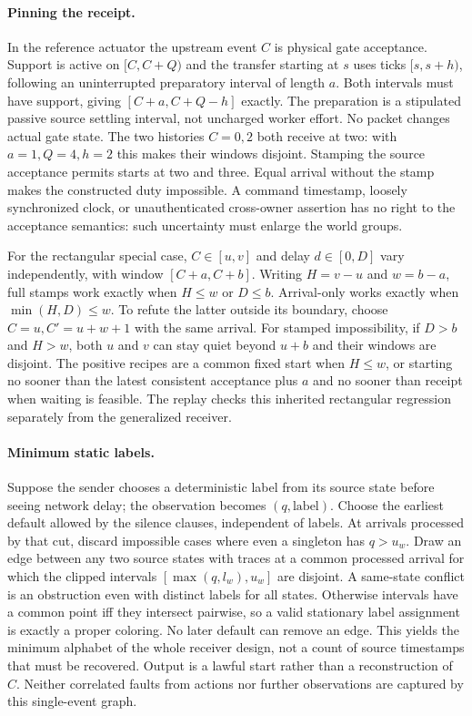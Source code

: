 \documentclass[11pt]{article}
\begin{document}
\paragraph{Pinning the receipt.}
In the reference actuator the upstream event $C$ is physical gate
acceptance. Support is active on $[C,C+Q)$ and the transfer starting at
$s$ uses ticks $[s,s+h)$, following an uninterrupted preparatory
interval of length $a$. Both intervals must have support, giving
$[C+a,C+Q-h]$ exactly. The preparation is a stipulated passive source
settling interval, not uncharged worker effort. No packet changes actual
gate state. The two histories $C=0,2$ both receive at two: with $a=1,Q=4,
h=2$ this makes their windows disjoint. Stamping the source acceptance
permits starts at two and three. Equal arrival without the stamp makes
the constructed duty impossible. A command timestamp, loosely
synchronized clock, or unauthenticated cross-owner assertion has no right
to the acceptance semantics: such uncertainty must enlarge the world
groups.

For the rectangular special case, $C\in[u,v]$ and delay $d\in[0,D]$
vary independently, with window $[C+a,C+b]$. Writing $H=v-u$ and
$w=b-a$, full stamps work exactly when $H\le w$ or $D\le b$.
Arrival-only works exactly when $\min(H,D)\le w$. To refute the latter
outside its boundary, choose $C=u,C'=u+w+1$ with the same arrival.
For stamped impossibility, if $D>b$ and $H>w$, both $u$ and $v$ can
stay quiet beyond $u+b$ and their windows are disjoint. The positive
recipes are a common fixed start when $H\le w$, or starting no sooner
than the latest consistent acceptance plus $a$ and no sooner than
receipt when waiting is feasible. The replay checks this inherited
rectangular regression separately from the generalized receiver.

\paragraph{Minimum static labels.}
Suppose the sender chooses a deterministic label from its source state
before seeing network delay; the observation becomes $(q,\mathrm{label})$.
Choose the earliest default allowed by the silence clauses, independent of
labels. At arrivals processed by that cut, discard impossible cases where
even a singleton has $q>u_w$. Draw an edge between any two source states
with traces at a common processed arrival for which the clipped intervals
$[\max(q,l_w),u_w]$ are disjoint. A same-state conflict is an obstruction
even with distinct labels for all states. Otherwise intervals have a
common point iff they intersect pairwise, so a valid stationary label
assignment is exactly a proper coloring. No later default can remove an
edge. This yields the minimum alphabet of the whole receiver design, not
a count of source timestamps that must be recovered. Output is a lawful
start rather than a reconstruction of $C$. Neither correlated faults
from actions nor further observations are captured by this single-event
graph.
\end{document}
